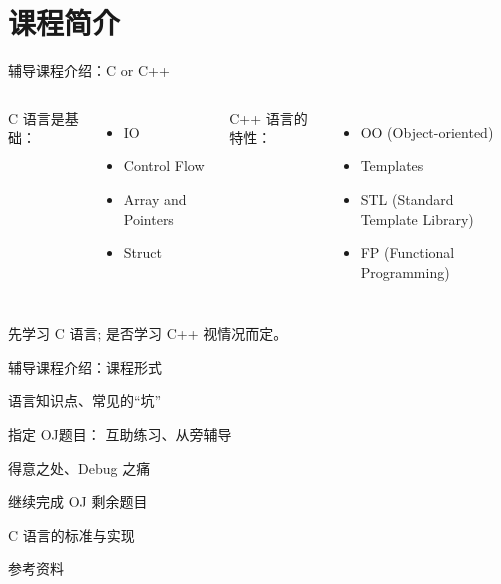 \section{课程简介}

\begin{frame}{辅导课程介绍：C or C++}
  \begin{columns}
      C 语言是基础：
      \begin{itemize}
	\item IO
	\item Control Flow
	\item Array and Pointers
	\item Struct
      \end{itemize}
      C++ 语言的特性：
      \begin{itemize}
	\item OO (Object-oriented)
	\item Templates
	\item STL (Standard Template Library)
	\item FP (Functional Programming)
      \end{itemize}
  \end{columns}

  \vspace{1.00cm}
  \centerline{先学习 C 语言; 是否学习 C++ 视情况而定。}
\end{frame}

\begin{frame}{辅导课程介绍：课程形式}
  \begin{description}
    \setlength{\itemsep}{8pt}
    \item[讲解] 语言知识点、常见的``坑''
    \item[练习] 指定 OJ题目： 互助练习、从旁辅导
    \item[分享] 得意之处、Debug 之痛
    \pause
    \item[课后] 继续完成 OJ 剩余题目
  \end{description}
\end{frame}

\begin{frame}{C 语言的标准与实现}
  
\end{frame}

\begin{frame}{参考资料}

\end{frame}
